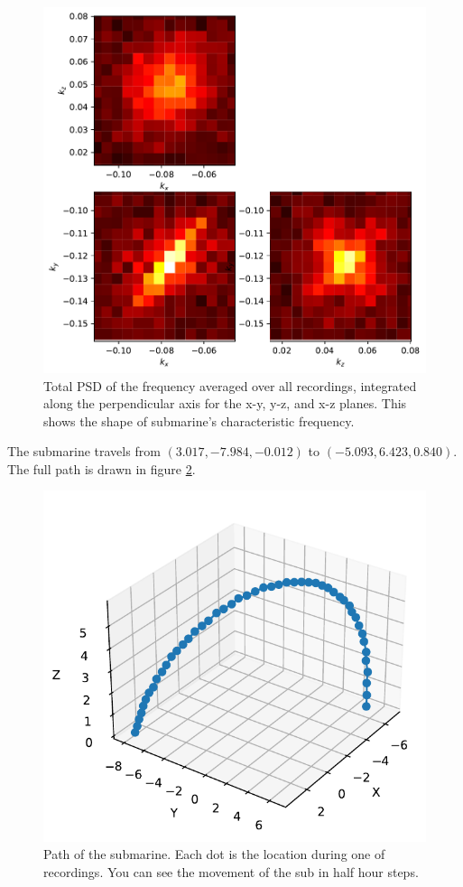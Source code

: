 \documentclass{article}
\begin{document}
    \begin{figure} \label{fig:freq_proj}
        \centering
        \includegraphics[width=.8\textwidth]{projected_freq.pdf}
        \caption{Total PSD of the frequency averaged over all recordings, integrated along the perpendicular axis for the x-y, y-z, and x-z planes. This shows the shape of submarine's characteristic frequency.}
    \end{figure}    

    The submarine travels from $(3.017,-7.984,-0.012)$ to $(-5.093,6.423,0.840)$. The full path is drawn in figure \ref{fig:path}.

    \begin{figure} \label{fig:path}
        \centering
        \includegraphics[width=.6\textwidth]{path.pdf}
        \caption{Path of the submarine. Each dot is the location during one of recordings. You can see the movement of the sub in half hour steps.}
    \end{figure}
\end{document}
